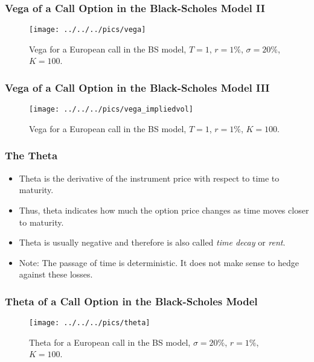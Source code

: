 \begin{frame}[fragile]
\frametitle{Vega of a Call Option in the Black-Scholes Model II}
\begin{figure}[htp]
\begin{center}
  \texttt{[image: ../../../pics/vega]}
  \caption{Vega for a European call in the BS model, $T=1$, $r=1\%$,
  $\sigma=20\%$, $K=100$.}
  \label{fig:vegaBS}
\end{center}
\end{figure}
\end{frame}

\begin{frame}[fragile]
\frametitle{Vega of a Call Option in the Black-Scholes Model III}
\begin{figure}[htp]
\begin{center}
  \texttt{[image: ../../../pics/vega\_impliedvol]}
  \caption{Vega for a European call in the BS model, $T=1$, $r=1\%$, $K=100$.}
  \label{fig:vega2BS}
\end{center}
\end{figure}
\end{frame}

\begin{frame}[fragile]
\frametitle{The Theta}
\begin{itemize}
  \item Theta is the derivative of the instrument price with respect to
  time to maturity.
  \item Thus, theta indicates how much the option price changes as time moves
  closer to maturity.
  \item Theta is usually negative and therefore is also called \emph{time decay}
  or \emph{rent}.
  \item Note: The passage of time is deterministic. It does not make sense to
  hedge against these losses.
\end{itemize}
\end{frame}

\begin{frame}[fragile]
\frametitle{Theta of a Call Option in the Black-Scholes Model}
\begin{figure}[htp]
\begin{center}
  \texttt{[image: ../../../pics/theta]}
  \caption{Theta for a European call in the BS model, $\sigma=20\%$, $r=1\%$,
  $K=100$.}
  \label{fig:thetaBS}
\end{center}
\end{figure}
\end{frame}

